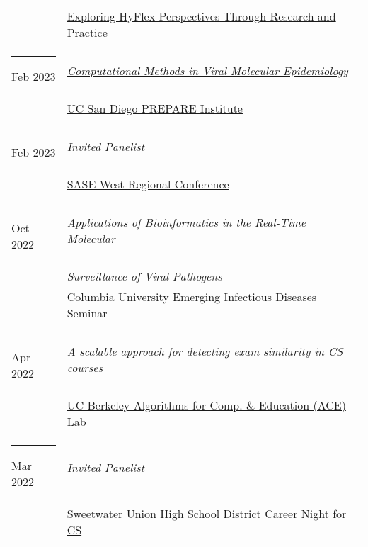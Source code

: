 \documentclass[margin,line]{res}
\begin{document}
\begin{resume}
\begin{longtable}{@{}p{0.7in}p{4in}}
\hspace*{-4mm} & \hspace{4mm} \href{https://teaching.ucr.edu/deck/2023/03/09/exploring-hyflex-perspectives-through-research-and-practice-panel-discussion}{Exploring HyFlex Perspectives Through Research and Practice}\\
\hspace*{-4mm} \rule{-1mm}{5mm} Feb 2023 & \href{https://youtu.be/IkSkQPXsXds}{\textit{Computational Methods in Viral Molecular Epidemiology}}\\*
\hspace*{-4mm} & \hspace{4mm} \href{https://prepare.ucsd.edu/}{UC San Diego PREPARE Institute}\\
\hspace*{-4mm} \rule{-1mm}{5mm} Feb 2023 & \href{https://www.saseconnect.org/regional-conferences}{\textit{Invited Panelist}}\\*
\hspace*{-4mm} & \hspace{4mm} \href{https://www.saseconnect.org/regional-conferences}{SASE West Regional Conference}\\
\hspace*{-4mm} \rule{-1mm}{5mm} Oct 2022 & \textit{Applications of Bioinformatics in the Real-Time Molecular}\\*
\hspace*{-4mm} & \hspace{4mm} \textit{Surveillance of Viral Pathogens}\\*
\hspace*{-4mm} & \hspace{4mm} Columbia University Emerging Infectious Diseases Seminar\\
\hspace*{-4mm} \rule{-1mm}{5mm} Apr 2022 & \textit{A scalable approach for detecting exam similarity in CS courses}\\*
\hspace*{-4mm} & \hspace{4mm} \href{https://acelab.berkeley.edu/}{UC Berkeley Algorithms for Comp. \& Education (ACE) Lab}\\
\hspace*{-4mm} \rule{-1mm}{5mm} Mar 2022 & \href{http://www.sweetwaterschools.org/}{\textit{Invited Panelist}}\\*
\hspace*{-4mm} & \hspace{4mm} \href{http://www.sweetwaterschools.org/}{Sweetwater Union High School District Career Night for CS}\\

\end{longtable}
\end{resume}
\end{document}
